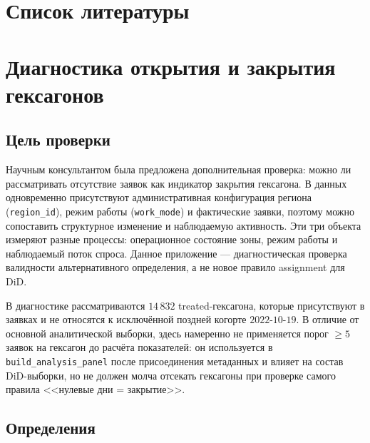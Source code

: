 \documentclass[14pt,a4paper]{extarticle}
\begin{document}
\section{Список литературы}

\begingroup
\renewcommand*{\bibfont}{\footnotesize}
\sloppy
\printbibliography[heading=none]
\endgroup

\appendix
\section{Диагностика открытия и закрытия гексагонов}
\label{app:hex_open_close}

\subsection{Цель проверки}

Научным консультантом была предложена дополнительная проверка: можно ли рассматривать отсутствие заявок как индикатор закрытия гексагона. В данных одновременно присутствуют административная конфигурация региона (\texttt{region\_id}), режим работы (\texttt{work\_mode}) и фактические заявки, поэтому можно сопоставить структурное изменение и наблюдаемую активность. Эти три объекта измеряют разные процессы: операционное состояние зоны, режим работы и наблюдаемый поток спроса. Данное приложение --- диагностическая проверка валидности альтернативного определения, а не новое правило assignment для DiD.

В диагностике рассматриваются \(14\,832\) treated-гексагона, которые присутствуют в заявках и не относятся к исключённой поздней когорте \(2022\text{-}10\text{-}19\). В отличие от основной аналитической выборки, здесь намеренно не применяется порог \(\geq 5\) заявок на гексагон до расчёта показателей: он используется в \texttt{build\_analysis\_panel} после присоединения метаданных и влияет на состав DiD-выборки, но не должен молча отсекать гексагоны при проверке самого правила <<нулевые дни = закрытие>>.

\subsection{Определения}
\end{document}
